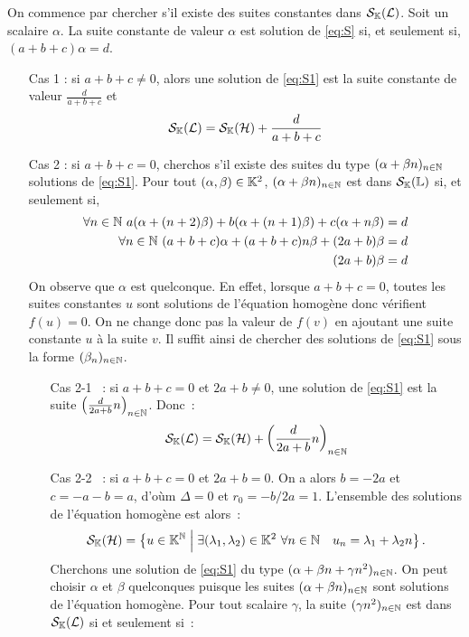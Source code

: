 On commence par chercher s'il existe des suites constantes dans $\mathcal{S}_{\mathbb{K}}(\mathcal{L})$. Soit un scalaire $\alpha$. La suite constante de valeur $\alpha$ est solution de \eqref{eq:S} si, et seulement si, $(a+b+c)\alpha=d$.
\begin{itemize}
\item[Cas 1] : si $a+b+c \neq 0$, alors une solution de \eqref{eq:S1} est la suite constante de valeur $\frac{d}{a+b+c}$ et
  \begin{equation}
    \mathcal{S}_{\mathbb{K}}(\mathcal{L}) = \mathcal{S}_{\mathbb{K}}(\mathcal{H}) +\frac{d}{a+b+c}
  \end{equation}
\item[Cas 2] : si $a+b+c=0$, cherchos s'il existe des suites du type $(\alpha+\beta n)_{n \in \mathbb{N}}$ solutions de \eqref{eq:S1}. Pour tout $(\alpha,\beta) \in \mathbb{K}^2$, $(\alpha + \beta n)_{n \in \mathbb{N}}$ est dans $\mathcal{S}_{\mathbb{K}}(\mathbb{L})$ si, et seulement si,
  \begin{align}
    \forall n \in \mathbb{N} \ a(\alpha +(n+2)\beta)+b(\alpha+(n+1)\beta)+c(\alpha +n\beta) &=d \\
    \forall n \in \mathbb{N} \ (a+b+c)\alpha +(a+b+c)n\beta +(2a+b)\beta &=d\\
    (2a+b)\beta &=d
  \end{align}
  On observe que $\alpha$ est quelconque. En effet, lorsque $a+b+c=0$, toutes les suites constantes $u$ sont solutions de l'équation homogène donc vérifient $f(u)=0$. On ne change donc pas la valeur de $f(v)$ en ajoutant une suite constante $u$ à la suite $v$. Il suffit ainsi de chercher des solutions de \eqref{eq:S1} sous la forme $(\beta_n)_{n \in \mathbb{N}}$.
  \begin{itemize}
  \item[Cas 2-1]~: si $a+b+c=0$ et $2a+b \neq 0$, une solution de \eqref{eq:S1} est la suite $\left(\frac{d}{2a+b}n\right)_{n \in \mathbb{N}}$. Donc~:
    \begin{equation}
      \mathcal{S}_{\mathbb{K}}(\mathcal{L}) = \mathcal{S}_{\mathbb{K}}(\mathcal{H}) + \left(\frac{d}{2a+b}n\right)_{n \in \mathbb{N}}
    \end{equation}
  \item[Cas 2-2]~: si $a+b+c=0$ et $2a+b = 0$. On a alors $b=-2a$ et $c=-a-b=a$, d'oùm $\Delta=0$ et $r_0=-b/2a=1$. L'ensemble des solutions de l'équation homogène est alors~:
    \begin{equation}
      \mathcal{S}_{\mathbb{K}}(\mathcal{H}) = \left\{u \in \mathbb{K}^{\mathbb{N}}\mathrel{}\middle|\mathrel{}\exists (\lambda_1, \lambda_2) \in \mathbb{K}^2 \ \forall n \in \mathbb{N} \quad u_n = \lambda_1+\lambda_2 n\right\}.
    \end{equation}
    Cherchons une solution de \eqref{eq:S1} du type $(\alpha+\beta n + \gamma n^2)_{n \in \mathbb{N}}$. On peut choisir $\alpha$ et $\beta$ quelconques puisque les suites $(\alpha+\beta n)_{n \in \mathbb{N}}$ sont solutions de l'équation homogène. Pour tout scalaire $\gamma$, la suite $(\gamma n^2)_{n \in \mathbb{N}}$ est dans $\mathcal{S}_{\mathbb{K}}(\mathcal{L})$ si et seulement si~:

\end{itemize}
\end{itemize}

